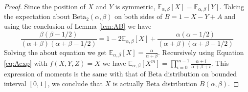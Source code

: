 \documentclass{elsarticle}
\def\E{\mathbb{E}}
\def\Beta{\textrm{Beta}}
\begin{document}
\begin{proof}
	Since the position of $X$ and $Y$ is symmetric,
	$\E_{\alpha, \beta}[X]=\E_{\alpha, \beta}[Y]$.
	Taking the expectation about $\Beta_2(\alpha, \beta)$
	on both sides of $B=1-X-Y+A$ and using the
	conclusion of Lemma \ref{lem:AB} we have
	\begin{equation*}
	\frac{\beta(\beta-1/2)}{(\alpha+\beta)(\alpha+\beta-1/2)}
	= 1 - 2\E_{\alpha, \beta}[X] +
	\frac{\alpha(\alpha-1/2)}{(\alpha+\beta)(\alpha+\beta-1/2)}
	\end{equation*}
	Solving the about equation we get
	$\E_{\alpha, \beta}[X]=\frac{\alpha}{\alpha + \beta}$.
	Recursively using Equation \eqref{eq:Aexp} with $f(X,Y,Z)=X$
	we have $\E_{\alpha, \beta}[X^m] =
	\prod_{i=0}^{m-1}\frac{\alpha+i}{\alpha+\beta+i}$.
	This expression of moments
	is the same with that of Beta distribution on bounded interval $[0,1]$, we
	conclude that $X$ is actually Beta distribution $B(\alpha,
	\beta)$.
\end{proof}
\end{document}
